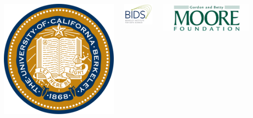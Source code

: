\documentclass[11pt,xcolor=dvipsnames]{beamer}
\begin{document}
\begin{frame}
\begin{overlayarea}{12cm}{4cm}
{\begin{columns}
\begin{column}{0.12\linewidth}
\includegraphics[width=0.9\linewidth]{images/uc_berkeley.png}
\end{column}
\begin{column}{0.12\linewidth}
\includegraphics[width=0.9\linewidth]{images/bids.png}
\end{column}
\begin{column}{0.12\linewidth}
\includegraphics[width=0.9\linewidth]{images/moore_foundation.jpg}

\end{column}
\end{columns}}
\end{overlayarea}
\end{frame}
\end{document}
